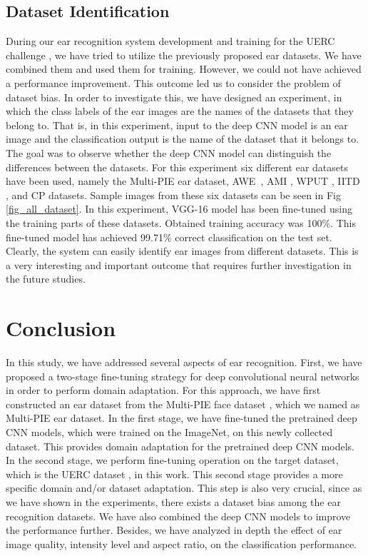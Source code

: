 \documentclass[11pt,journal,compsoc]{IEEEtran}
\begin{document}
\subsection{Dataset Identification}
During our ear recognition system development and training for the UERC challenge \cite{Emersic_2017_b}, we have tried to utilize the previously proposed ear datasets. We have combined them and used them for training. However, we could not have achieved a performance improvement. This outcome led us to consider the problem of dataset bias. In order to investigate this, we have designed an experiment, in which the class labels of the ear images are the names of the datasets that they belong to. That is, in this experiment, input to the deep CNN model is an ear image and the classification output is the name of the dataset that it belongs to. The goal was to observe whether the deep CNN model can distinguish the differences between the datasets. For this experiment six different ear datasets have been used, namely the Multi-PIE ear dataset, AWE~\cite{Emersic_2017_a}, AMI \cite{Gonzalez_2008}, WPUT \cite{Frejlichowski_2010}, IITD \cite{Kumar_2012}, and CP \cite{Carreira_Perpinan_1995} datasets. Sample images from these six datasets can be seen in Fig \ref{fig_all_dataset}. In this experiment, VGG-16 model \cite{Simonyan_2014} has been fine-tuned using the training parts of these datasets. Obtained training accuracy was 100\%. This fine-tuned model has achieved 99.71\% correct classification on the test set. Clearly, the system can easily identify ear images from different datasets. This is a very interesting and important outcome that requires further investigation in the future studies. 

\section{Conclusion}
In this study, we have addressed several aspects of ear recognition. First, we have proposed a two-stage fine-tuning strategy for deep convolutional neural networks in order to perform domain adaptation. For this approach, we have first constructed an ear dataset from the Multi-PIE face dataset \cite{Gross_2008_a,Gross_2008_b}, which we named as Multi-PIE ear dataset. In the first stage, we have fine-tuned the pretrained deep CNN models, which were trained on the ImageNet, on this newly collected dataset. This provides domain adaptation for the pretrained deep CNN models. In the second stage, we perform fine-tuning operation on the target dataset, which is the UERC dataset \cite{Emersic_2017_b}, in this work. This second stage provides a more specific domain and/or dataset adaptation. This step is also very crucial, since as we have shown in the experiments, there exists a dataset bias \cite{Torralba_2011} among the ear recognition datasets. We have also combined the deep CNN models to improve the performance further. Besides, we have analyzed in depth the effect of ear image quality, intensity level and aspect ratio, on the classification performance.
\end{document}
